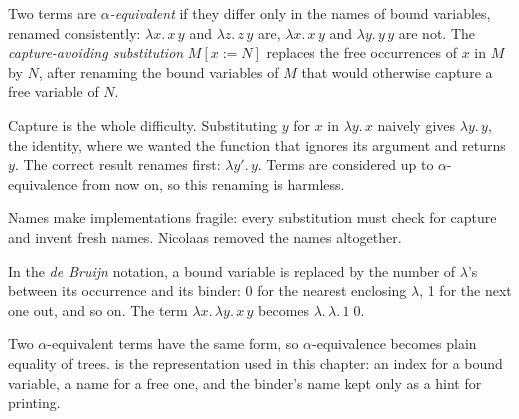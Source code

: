\begin{definition}\label{def:b3:lambda-calculus:alpha}
Two terms are \emph{$\alpha$-equivalent} if they differ only in the names of bound variables, renamed consistently: $\lambda x.\,x\,y$ and $\lambda z.\,z\,y$ are, $\lambda x.\,x\,y$ and $\lambda y.\,y\,y$ are not. The \emph{capture-avoiding substitution} $M[x := N]$ replaces the free occurrences of $x$ in $M$ by $N$, after renaming the bound variables of $M$ that would otherwise capture a free variable of $N$.
\end{definition}

Capture is the whole difficulty. Substituting $y$ for $x$ in $\lambda y.\,x$ naively gives $\lambda y.\,y$, the identity, where we wanted the function that ignores its argument and returns $y$. The correct result renames first: $\lambda y'.\,y$. Terms are considered up to $\alpha$-equivalence from now on, so this renaming is harmless.

Names make implementations fragile: every substitution must check for capture and invent fresh names. Nicolaas  removed the names altogether.

\begin{definition}\label{def:b3:lambda-calculus:debruijn}
In the \emph{de Bruijn} notation, a bound variable is replaced by the number of $\lambda$'s between its occurrence and its binder: 0 for the nearest enclosing $\lambda$, 1 for the next one out, and so on. The term $\lambda x.\,\lambda y.\,x\,y$ becomes $\lambda.\,\lambda.\,1\;0$.
\end{definition}

Two $\alpha$-equivalent terms have the same  form, so $\alpha$-equivalence becomes plain equality of trees.  is the representation used in this chapter: an index for a bound variable, a name for a free one, and the binder's name kept only as a hint for printing.

\label{lst:b3:lambda-calculus:term}

